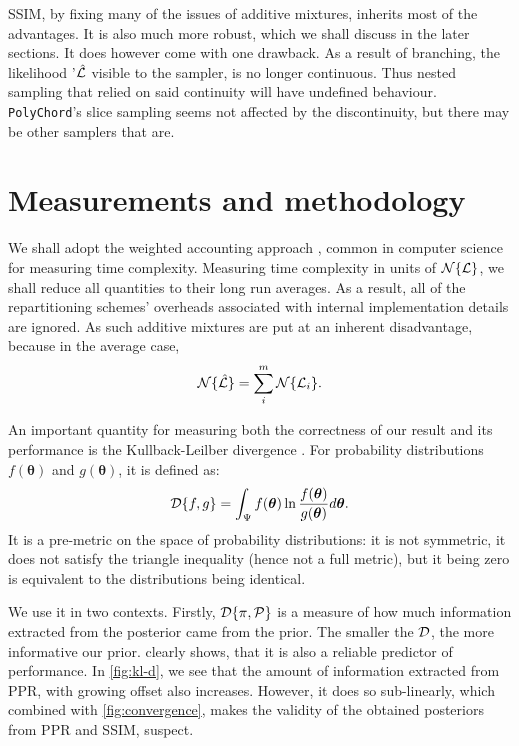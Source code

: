 \documentclass[usenatbib]{mnras}
\begin{document}
SSIM, by fixing many of the issues of additive mixtures, inherits most
of the advantages. It is also much more robust, which we shall discuss
in the later sections. It does however come with one drawback. As a
result of branching, the likelihood '$\hat{\cal L}$ visible to the
sampler, is no longer continuous. Thus nested sampling that relied on
said continuity will have undefined behaviour. \texttt{PolyChord}'s
slice sampling seems not affected by the discontinuity, but there may be
other samplers that are.
\section{Measurements and methodology}
We shall adopt the weighted accounting approach \citep{Cormen}, common
in computer science for measuring time complexity. Measuring time
complexity in units of \({\cal N}\{{\cal L}\}\), we shall reduce all
quantities to their long run averages. As a result, all of the
repartitioning schemes' overheads associated with internal
implementation details are ignored. As such additive mixtures are put
at an inherent disadvantage, because in the average case,
\begin{equation}
  \label{eq:additive-t-complexity}
  {\cal N}\{ \hat{\cal L}\} = \sum_{i}^{m} {\cal N}\{{\cal L}_{i}\}. 
\end{equation}

An important quantity for measuring both the correctness of our result
and its performance is the Kullback-Leilber divergence
\citep{Kullback_1951}. For probability distributions
\(f(\bm{\theta})\) and \(g(\bm{\theta})\), it is defined as:
\begin{equation}
  \label{eq:kl-def}
  {\cal D}\{f, g \} = \int_{\Psi}f(\bm{\theta}) \ln \frac{f(\bm{\theta})}{g(\bm{\theta})} d \bm{\theta}.
\end{equation}
It is a pre-metric on the space of probability distributions: it is
not symmetric, it does not satisfy the triangle inequality (hence not
a full metric), but it being zero is equivalent to the distributions
being identical.

We use it in two contexts. Firstly, ${\cal D}\{\pi, {\cal P}\}$ is a
measure of how much information extracted from the posterior came from
the prior. The smaller the ${\cal D}$, the more informative our
prior.  clearly shows, that it is also a reliable
predictor of performance. In \cref{fig:kl-d}, we see that the amount
of information extracted from PPR, with growing offset also
increases. However, it does so sub-linearly, which combined with
\cref{fig:convergence}, makes the validity of the obtained posteriors
from PPR and SSIM, suspect. 
\end{document}
